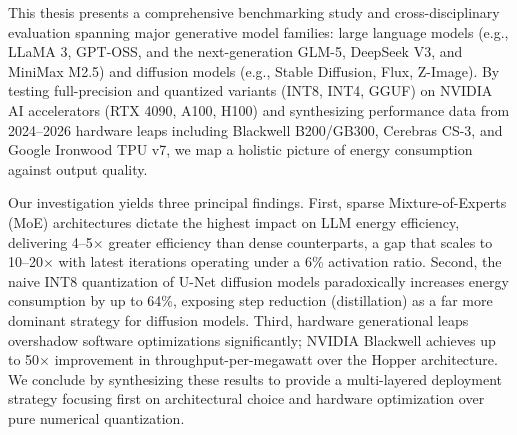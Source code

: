 \documentclass[12pt, a4paper]{report}
\begin{document}
This thesis presents a comprehensive benchmarking study and cross-disciplinary evaluation spanning major generative model families: large language models (e.g., LLaMA 3, GPT-OSS, and the next-generation GLM-5, DeepSeek V3, and MiniMax M2.5) and diffusion models (e.g., Stable Diffusion, Flux, Z-Image). By testing full-precision and quantized variants (INT8, INT4, GGUF) on NVIDIA AI accelerators (RTX 4090, A100, H100) and synthesizing performance data from 2024–2026 hardware leaps including Blackwell B200/GB300, Cerebras CS-3, and Google Ironwood TPU v7, we map a holistic picture of energy consumption against output quality. 

Our investigation yields three principal findings. First, sparse Mixture-of-Experts (MoE) architectures dictate the highest impact on LLM energy efficiency, delivering 4--5$\times$ greater efficiency than dense counterparts, a gap that scales to 10--20$\times$ with latest iterations operating under a 6\% activation ratio. Second, the naive INT8 quantization of U-Net diffusion models paradoxically increases energy consumption by up to 64\%, exposing step reduction (distillation) as a far more dominant strategy for diffusion models. Third, hardware generational leaps overshadow software optimizations significantly; NVIDIA Blackwell achieves up to 50$\times$ improvement in throughput-per-megawatt over the Hopper architecture. We conclude by synthesizing these results to provide a multi-layered deployment strategy focusing first on architectural choice and hardware optimization over pure numerical quantization.

\clearpage
\renewcommand{\contentsname}{TABLE OF CONTENTS}
\tableofcontents

\clearpage
\listoffigures
{}

\clearpage
\listoftables
{}


\clearpage
{}
\setcounter{page}{1}
\end{document}
